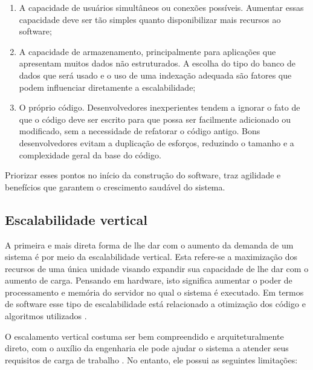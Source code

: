   \begin{enumerate}
    \item A capacidade de usuários simultâneos ou conexões possíveis.
    Aumentar essas capacidade deve ser tão simples quanto disponibilizar mais
    recursos ao software;
    \item A capacidade de armazenamento, principalmente para aplicações
    que apresentam muitos dados não estruturados. A escolha do tipo do banco de
    dados que será usado e o uso de uma indexação adequada são fatores que
    podem influenciar diretamente a escalabilidade;
    \item O próprio código. Desenvolvedores inexperientes tendem a ignorar
    o fato de que o código deve ser escrito para que possa ser facilmente
    adicionado ou modificado, sem a necessidade de refatorar o código antigo.
    Bons desenvolvedores evitam a duplicação de esforços, reduzindo o tamanho
    e a complexidade geral da base do código.
  \end{enumerate}

Priorizar esses pontos no início da construção do software, traz agilidade e
benefícios que garantem o crescimento saudável do sistema.

\subsection{Escalabilidade vertical}

A primeira e mais direta forma de lhe dar com o aumento da demanda de um
sistema é por meio da escalabilidade vertical. Esta refere-se a maximização
dos recursos de uma única unidade visando expandir sua capacidade de lhe dar
com o aumento de carga.  Pensando em hardware, isto significa aumentar o poder
de processamento e memória do servidor no qual o sistema é executado. Em termos
de software esse tipo de escalabilidade está relacionado a otimização dos código
e algoritmos utilizados \cite{FreshGuide2012}.

O escalamento vertical costuma ser bem compreendido e arquiteturalmente direto,
com o auxílio da engenharia ele pode ajudar o sistema a atender seus requisitos
de carga de trabalho \cite{InterSystems2019}. No entanto, ele possui as seguintes
limitações:

